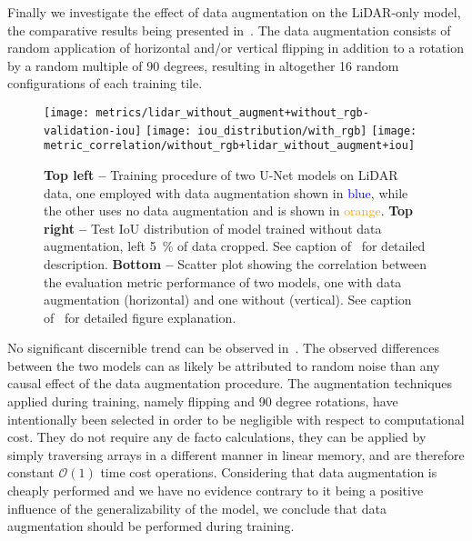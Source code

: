 
Finally we investigate the effect of data augmentation on the LiDAR-only model, the comparative results being presented in~.
The data augmentation consists of random application of horizontal and/or vertical flipping in addition to a rotation by a random multiple of 90 degrees, resulting in altogether 16 random configurations of each training tile.

\begin{figure}[H]
  \centering
  \texttt{[image: metrics/lidar\_without\_augment+without\_rgb-validation-iou]}
  \texttt{[image: iou\_distribution/with\_rgb]}
  \texttt{[image: metric\_correlation/without\_rgb+lidar\_without\_augment+iou]}
  \hspace{-0.9em}
  \caption{%
    \textbf{Top left --} Training procedure of two U-Net models on LiDAR data, one employed with data augmentation shown in \textcolor{blue}{blue}, while the other uses no data augmentation and is shown in \textcolor{orange}{orange}.
    \textbf{Top right --} Test IoU distribution of model trained without data augmentation, left \SI{5}{\percent} of data cropped.
    See caption of~ for detailed description.
    \textbf{Bottom --} Scatter plot showing the correlation between the evaluation metric performance of two models, one with data augmentation (horizontal) and one without (vertical).
    See caption of~ for detailed figure explanation.
  }%
  \label{fig:data-augmentation-experiment}
\end{figure}

No significant discernible trend can be observed in~.
The observed differences between the two models can as likely be attributed to random noise than any causal effect of the data augmentation procedure.
The augmentation techniques applied during training, namely flipping and 90 degree rotations, have intentionally been selected in order to be negligible with respect to computational cost.
They do not require any de facto calculations, they can be applied by simply traversing arrays in a different manner in linear memory, and are therefore constant $\mathcal{O}(1)$ time cost operations.
Considering that data augmentation is cheaply performed and we have no evidence contrary to it being a positive influence of the generalizability of the model, we conclude that data augmentation should be performed during training.

